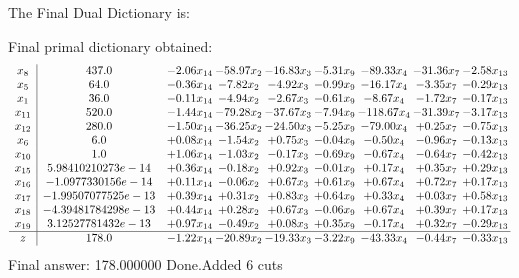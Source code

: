 \documentclass[8pt]{article}
\begin{document}
The Final Dual Dictionary is: 

 Final primal dictionary obtained: 
\[\begin{array}{c| c c@{\hskip 2pt} c@{\hskip 2pt} c@{\hskip 2pt} c@{\hskip 2pt} c@{\hskip 2pt} c@{\hskip 2pt} c@{\hskip 2pt} }
 x_{8}   &  437.0 & -2.06 x_{14} & -58.97 x_{2} & -16.83 x_{3} & -5.31 x_{9} & -89.33 x_{4} & -31.36 x_{7} & -2.58 x_{13}\\
 x_{5}   &  64.0 & -0.36 x_{14} & -7.82 x_{2} & -4.92 x_{3} & -0.99 x_{9} & -16.17 x_{4} & -3.35 x_{7} & -0.29 x_{13}\\
 x_{1}   &  36.0 & -0.11 x_{14} & -4.94 x_{2} & -2.67 x_{3} & -0.61 x_{9} & -8.67 x_{4} & -1.72 x_{7} & -0.17 x_{13}\\
 x_{11}   &  520.0 & -1.44 x_{14} & -79.28 x_{2} & -37.67 x_{3} & -7.94 x_{9} & -118.67 x_{4} & -31.39 x_{7} & -3.17 x_{13}\\
 x_{12}   &  280.0 & -1.50 x_{14} & -36.25 x_{2} & -24.50 x_{3} & -5.25 x_{9} & -79.00 x_{4} & +  0.25 x_{7} & -0.75 x_{13}\\
 x_{6}   &  6.0 & +  0.08 x_{14} & -1.54 x_{2} & +  0.75 x_{3} & -0.04 x_{9} & -0.50 x_{4} & -0.96 x_{7} & -0.13 x_{13}\\
 x_{10}   &  1.0 & +  1.06 x_{14} & -1.03 x_{2} & -0.17 x_{3} & -0.69 x_{9} & -0.67 x_{4} & -0.64 x_{7} & -0.42 x_{13}\\
 x_{15}   &  5.98410210273e-14 & +  0.36 x_{14} & -0.18 x_{2} & +  0.92 x_{3} & -0.01 x_{9} & +  0.17 x_{4} & +  0.35 x_{7} & +  0.29 x_{13}\\
 x_{16}   &  -1.0977330156e-14 & +  0.11 x_{14} & -0.06 x_{2} & +  0.67 x_{3} & +  0.61 x_{9} & +  0.67 x_{4} & +  0.72 x_{7} & +  0.17 x_{13}\\
 x_{17}   &  -1.99507077525e-13 & +  0.39 x_{14} & +  0.31 x_{2} & +  0.83 x_{3} & +  0.64 x_{9} & +  0.33 x_{4} & +  0.03 x_{7} & +  0.58 x_{13}\\
 x_{18}   &  -4.39481784298e-13 & +  0.44 x_{14} & +  0.28 x_{2} & +  0.67 x_{3} & -0.06 x_{9} & +  0.67 x_{4} & +  0.39 x_{7} & +  0.17 x_{13}\\
 x_{19}   &  3.12527781432e-13 & +  0.97 x_{14} & -0.49 x_{2} & +  0.08 x_{3} & +  0.35 x_{9} & -0.17 x_{4} & +  0.32 x_{7} & -0.29 x_{13}\\
\hline
z    &  178.0 & -1.22 x_{14} & -20.89 x_{2} & -19.33 x_{3} & -3.22 x_{9} & -43.33 x_{4} & -0.44 x_{7} & -0.33 x_{13}\\
\end{array}\]
 Final answer: 178.000000 
Done.Added 6 cuts 
\end{document}
